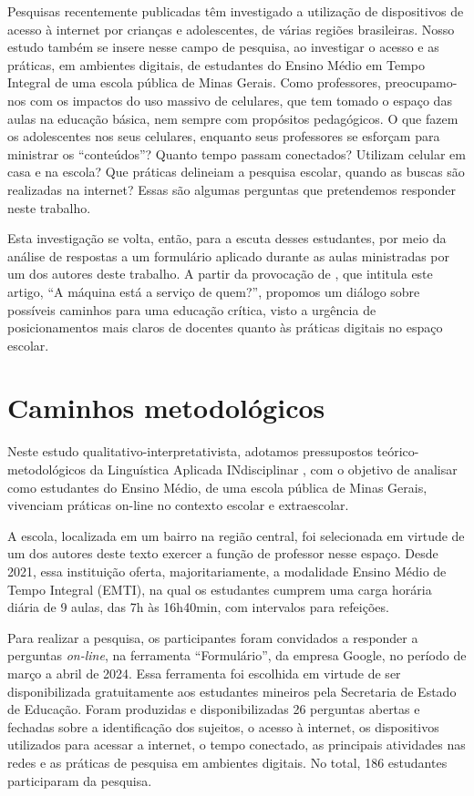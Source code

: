 \documentclass[portuguese]{textolivre}
\begin{document}
Pesquisas recentemente publicadas têm investigado a utilização de dispositivos de acesso à internet \cite{centro_regional_de_estudos_para_o_desenvolvimento_da_sociedade_da_informacao_tic_2023} por crianças e adolescentes, de várias regiões brasileiras. Nosso estudo também se insere nesse campo de pesquisa, ao investigar o acesso e as práticas, em ambientes digitais, de estudantes do Ensino Médio em Tempo Integral de uma escola pública de Minas Gerais. Como professores, preocupamo-nos com os impactos do uso massivo de celulares, que tem tomado o espaço das aulas na educação básica, nem sempre com propósitos pedagógicos. O que fazem os adolescentes nos seus celulares, enquanto seus professores se esforçam para ministrar os ``conteúdos''? Quanto tempo passam conectados? Utilizam celular em casa e na escola? Que práticas delineiam a pesquisa escolar, quando as buscas são realizadas na internet? Essas são algumas perguntas que pretendemos responder neste trabalho. 

Esta investigação se volta, então, para a escuta desses estudantes, por meio da análise de respostas a um formulário aplicado durante as aulas ministradas por um dos autores deste trabalho. A partir da provocação de \textcite{freire_maquina_1984}, que intitula este artigo, ``A máquina está a serviço de quem?'', propomos um diálogo sobre possíveis caminhos para uma educação crítica, visto a urgência de posicionamentos mais claros de docentes quanto às práticas digitais no espaço escolar.

\section{Caminhos metodológicos}\label{sec-normas}
Neste estudo qualitativo-interpretativista, adotamos pressupostos teórico-metodológicos da Linguística Aplicada INdisciplinar \cite{moita_lopes_por_2006}, com o objetivo de analisar como estudantes do Ensino Médio, de uma escola pública de Minas Gerais, vivenciam práticas on-line no contexto escolar e extraescolar. 

A escola, localizada em um bairro na região central, foi selecionada em virtude de um dos autores deste texto exercer a função de professor nesse espaço. Desde 2021, essa instituição oferta, majoritariamente, a modalidade Ensino Médio de Tempo Integral (EMTI), na qual os estudantes cumprem uma carga horária diária de 9 aulas, das 7h às 16h40min, com intervalos para refeições. 

Para realizar a pesquisa, os participantes foram convidados a responder a perguntas \textit{on-line}, na ferramenta ``Formulário'', da empresa Google, no período de março a abril de 2024. Essa ferramenta foi escolhida em virtude de ser disponibilizada gratuitamente aos estudantes mineiros pela Secretaria de Estado de Educação. Foram produzidas e disponibilizadas 26 perguntas abertas e fechadas sobre a identificação dos sujeitos, o acesso à internet, os dispositivos utilizados para acessar a internet, o tempo conectado, as principais atividades nas redes e as práticas de pesquisa em ambientes digitais. No total, 186 estudantes participaram da pesquisa.
\end{document}
